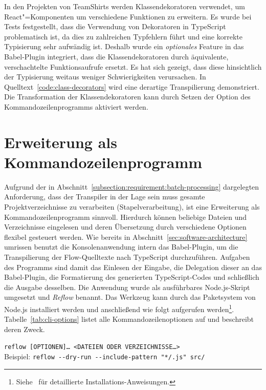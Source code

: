 In den Projekten von TeamShirts werden Klassendekoratoren verwendet, um React"=Komponenten um verschiedene Funktionen zu erweitern. Es wurde bei Tests festgestellt, dass die Verwendung von Dekoratoren in TypeScript problematisch ist, da dies zu zahlreichen Typfehlern führt und eine korrekte Typisierung sehr aufwändig ist. Deshalb wurde ein \emph{optionales} Feature in das Babel-Plugin integriert, dass die Klassendekoratoren durch äquivalente, verschachtelte Funktionsaufrufe ersetzt. Es hat sich gezeigt, dass diese hinsichtlich der Typisierung weitaus weniger Schwierigkeiten verursachen. In Quelltext~\ref{code:class-decorators} wird eine derartige Transpilierung demonstriert. Die Transformation der Klassendekoratoren kann durch Setzen der Option  des Kommandozeilenprogramms aktiviert werden.

\section{Erweiterung als Kommandozeilenprogramm}
\label{sec:cli-program}

Aufgrund der in Abschnitt~\ref{subsection:requirement:batch-processing} dargelegten Anforderung, dass der Transpiler in der Lage sein muss gesamte Projektverzeichnisse zu verarbeiten (Stapelverarbeitung), ist eine Erweiterung als Kommandozeilenprogramm sinnvoll. Hierdurch können beliebige Dateien und Verzeichnisse eingelesen und deren Übersetzung durch verschiedene Optionen flexibel gesteuert werden. Wie bereits in Abschnitt~\ref{sec:software-architecture} umrissen benutzt die Konsolenanwendung intern das Babel-Plugin, um die Transpilierung der Flow-Quelltexte nach TypeScript durchzuführen. Aufgaben des Programms sind damit das Einlesen der Eingabe, die Delegation dieser an das Babel-Plugin, die Formatierung des generierten TypeScript-Codes und schließlich die Ausgabe desselben.
Die Anwendung wurde als ausführbares Node.js-Skript umgesetzt und \textit{Reflow} benannt. Das Werkzeug kann durch das Paketsystem von Node.js installiert werden und anschließend wie folgt aufgerufen werden\footnote{Siehe~\autocite{REFLOW_GITHUB} für detaillierte Installations-Anweisungen.}. Tabelle~\ref{tab:cli-options} listet alle Kommandozeilenoptionen auf und beschreibt deren Zweck.

{
  \texttt{reflow [OPTIONEN]… <DATEIEN ODER VERZEICHNISSE…>}\\
  Beispiel: \texttt{reflow -{}-dry-run -{}-include-pattern "{}*/.js"{} src/}
}


